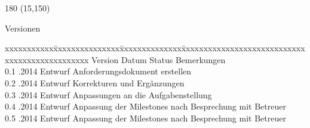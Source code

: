 
\begin{textblock}{180} (15,150)
\color{black}
\begin{huge}
Versionen
\end{huge}
\vspace{10mm}

\fontsize{10pt}{18pt}\selectfont
\begin{tabbing}
xxxxxxxxxxx\=xxxxxxxxxxxxxxx\=xxxxxxxxxxxxxx\=xxxxxxxxxxxxxxxxxxxxxxxxxxxxxxxxxxxxxxxxxxxxxxx \kill
Version	\> Datum	\> Status		\> Bemerkungen\\
0.1	.2014	\> Entwurf		\> Anforderungsdokument erstellen\\
0.2	.2014	\> Entwurf		\> Korrekturen und Ergänzungen\\
0.3	.2014	\> Entwurf		\> Anpassungen an die Aufgabenstellung\\
0.4	.2014	\> Entwurf		\> Anpassung der Milestones nach Besprechung mit Betreuer\\
0.5	.2014	\> Entwurf		\> Anpassung der Milestones nach Besprechung mit Betreuer\\
\end{tabbing}

\end{textblock}
